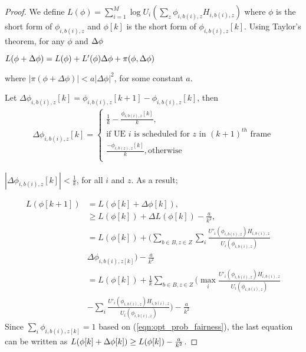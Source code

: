 \documentclass[conference]{IEEEtran}
\begin{document}
\begin{proof}
We define $L(\phi)=\sum_{i=1}^M \log U_i(\sum_z\phi_{i,b(i),z}H_{i,b(i),z})$ where $\phi$ is the short form of $\phi_{i,b(i),z}$ and $\phi[k]$ is the short form of $\phi_{i,b(i),z}[k]$. Using Taylor's theorem, for any $\phi$ and $\Delta\phi\\$

$L(\phi+\Delta\phi)=L(\phi)+L'(\phi)\Delta\phi+\pi(\phi,\Delta\phi)\\$ 

where $|\pi(\phi+\Delta\phi)|<a |\Delta\phi|^2$, for some constant $a$. 

Let $\Delta\phi_{i,b(i),z}[k]=\phi_{i,b(i),z}[k+1]-\phi_{i,b(i),z}[k]$, then 
\begin{equation*}\label{eqn:delta_phi_eqn}
\begin{aligned}
\Delta\phi_{i,b(i),z}[k]=
\begin{cases}
	\frac{1}{k}-\frac{\phi_{i,b(i),z}[k]}{k},\\ 
	\text{if UE $i$ is scheduled for $z$ in $(k+1)^{th}$ frame}\\
	\frac{-\phi_{i,b(z),z}[k]}{k},\text{otherwise}\\
\end{cases}
\end{aligned}
\end{equation*}
 
$|\Delta\phi_{i,b(i),z}[k]|<\frac{1}{k}$, for all $i$ and $z$. As a result;

\begin{equation*}\label{eqn:L_inequality}
\begin{aligned}
L(\phi[k+1]) & = L(\phi[k]+\Delta\phi[k]),\\
& \geq L(\phi[k])+\Delta 
L(\phi[k])-\frac{a}{k^2},\\
&=L(\phi[k])+ \Big( \sum_{b \in B,z \in Z}\sum_i \frac{U'_i(\phi_{i,b(i),z})H_{i,b(i),z}}{U_i(\phi_{i,b(i),z})}\\
&\Delta\phi_{i,b(i),z[k]} \Big) -\frac{a}{k^2} \\
&=L(\phi[k])+\frac{1}{k}\sum_{b \in B,z \in Z}\Big (\max_i\frac{U'_i(\phi_{i,b(i),z})H_{i,b(i),z}}{U_i(\phi_{i,b(i),z})} \\
&-\sum_i\frac{U'_i(\phi_{i,b(i),z})H_{i,b(i),z}}{U_i(\phi_{i,b(i),z})}\Big )-\frac{a}{k^2}
\end{aligned}
\end{equation*}
Since $\sum_i\phi_{i,b(i),z[k]}=1$ based on (\ref{eqn:opt_prob_fairness}), the last equation can be written as 
$L(\phi[k]+\Delta\phi[k]) \geq L(\phi[k])-\frac{a}{k^2} \\$.


\end{proof}
\end{document}
